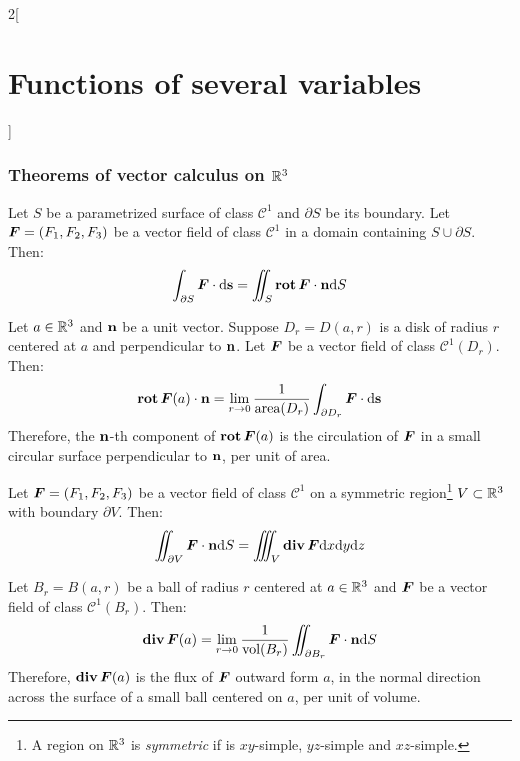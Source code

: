 \documentclass[../../../main.tex]{subfiles}
\begin{document}
\begin{multicols}{2}[\section{Functions of several variables}]
  \subsubsection*{Theorems of vector calculus on \texorpdfstring{$\mathbb{R}^3$}{R3}}
  \begin{theorem}
    Let $S$ be a parametrized surface of class $\mathcal{C}^1$ and $\partial S$ be its boundary. Let $\boldsymbol{F}=(F_1,F_2,F_3)$ be a vector field of class $\mathcal{C}^1$ in a domain containing $S\cup\partial S$. Then: $$\int_{\partial S}\boldsymbol{F}\cdot \dd \vb{s}=\iint_S\operatorname{\vb{rot}}\boldsymbol{F}\cdot\vb{n} \dd S$$
  \end{theorem}
  \begin{corollary}
    Let $a\in\mathbb{R}^3$ and $\vb{n}$ be a unit vector. Suppose $D_r=D(a,r)$ is a disk of radius $r$ centered at $a$ and perpendicular to $\vb{n}$. Let $\boldsymbol{F}$ be a vector field of class $\mathcal{C}^1(D_r)$. Then: $$\operatorname{\vb{rot}}\boldsymbol{F}(a)\cdot\vb{n}=\lim_{r\to 0}\frac{1}{\text{area}(D_r)}\int_{\partial D_r}\boldsymbol{F}\cdot \dd \vb{s}$$ Therefore, the $\vb{n}$-th component of $\operatorname{\vb{rot}}\boldsymbol{F}(a)$ is the circulation of $\boldsymbol{F}$ in a small circular surface perpendicular to $\vb{n}$, per unit of area.
  \end{corollary}
  \begin{theorem}
    Let $\boldsymbol{F}=(F_1,F_2,F_3)$ be a vector field of class $\mathcal{C}^1$ on a symmetric region\footnote{A region on $\mathbb{R}^3$ is \textit{symmetric} if is $xy$-simple, $yz$-simple and $xz$-simple.} $V\subset\mathbb{R}^3$ with boundary $\partial V$. Then: $$\iint_{\partial V}\boldsymbol{F}\cdot\vb{n} \dd S=\iiint_V\operatorname{\vb{div}}\boldsymbol{F}\dd x\dd y\dd z$$
  \end{theorem}
  \begin{corollary}
    Let $B_r=B(a,r)$ be a ball of radius $r$ centered at $a\in\mathbb{R}^3$ and $\boldsymbol{F}$ be a vector field of class $\mathcal{C}^1(B_r)$. Then: $$\operatorname{\vb{div}}\boldsymbol{F}(a)=\lim_{r\to 0}\frac{1}{\text{vol}(B_r)}\iint_{\partial B_r}\boldsymbol{F}\cdot\vb{n} \dd S$$ Therefore, $\operatorname{\vb{div}}\boldsymbol{F}(a)$ is the flux of $\boldsymbol{F}$ outward form $a$, in the normal direction across the surface of a small ball centered on $a$, per unit of volume.
  \end{corollary}
\end{multicols}
\end{document}
